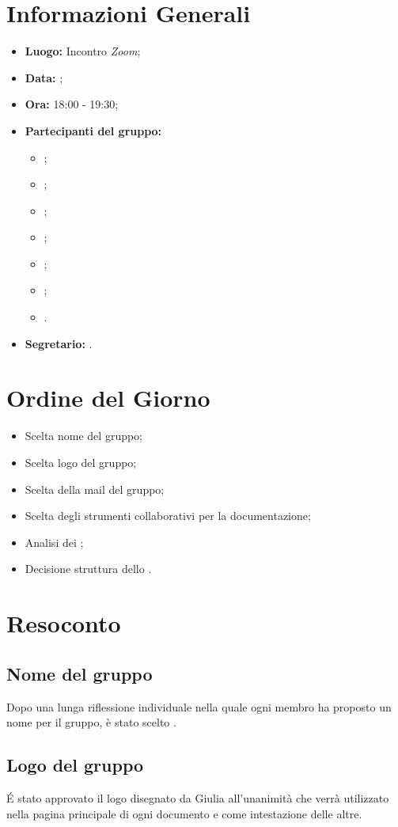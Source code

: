 \section{Informazioni Generali}
\begin{itemize}
\item \textbf{Luogo:} Incontro \textit{Zoom};
\item \textbf{Data:} \Data;
\item \textbf{Ora:} 18:00 - 19:30;
\item \textbf{Partecipanti del gruppo:}
	\begin{itemize}
		\item \BL{}; 
		\item \FF{};
		\item \MM{}; 
		\item \PC{};
		\item \TG{};
		\item \TL{};
		\item \VD{}.
	\end{itemize} 
\item \textbf{Segretario:} \PC{}.
\end{itemize}

\section{Ordine del Giorno}
\begin{itemize}
 \item Scelta nome del gruppo;
 \item Scelta logo del gruppo;
 \item Scelta della mail del gruppo;
 \item Scelta degli strumenti collaborativi per la documentazione;
 \item Analisi dei ;
 \item Decisione struttura dello \textit{\SdF}.
\end{itemize}

\section{Resoconto}
\subsection{Nome del gruppo}
Dopo una lunga riflessione individuale nella quale ogni membro ha proposto un nome per il gruppo, è stato scelto {\Gruppo}.

\subsection{Logo del gruppo}
É stato approvato il logo disegnato da Giulia all'unanimità che verrà utilizzato nella pagina principale di ogni documento e come intestazione delle altre.

